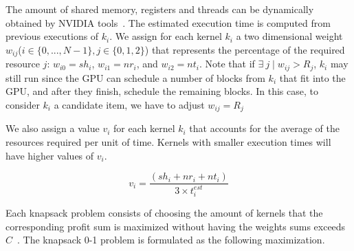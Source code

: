 \documentclass[conference]{IEEEtran}
\begin{document}

The amount of shared memory, registers and threads can be dynamically obtained by NVIDIA tools~\cite{}. The estimated execution time is computed from previous executions of $k_i$. We assign for each kernel $k_i$ a two dimensional weight $w_{ij}$($i \in \{0,...,N-1\}, j \in \{0,1,2\}$) that represents the percentage of the required resource $j$: $w_{i0} = sh_i$, $w_{i1} = nr_i$, and $w_{i2} = nt_i$. Note that if $\exists ~j \mid w_{ij} > R_j$, $k_i$ may still run since the GPU can schedule a number of blocks from $k_i$ that fit into the GPU, and after they finish, schedule the remaining blocks. In this case, to consider $k_i$ a candidate item, we have to adjust $w_{ij} = R_j$

We also assign a value $v_i$ for each kernel $k_i$ that accounts for the average of the resources required per unit of time. 
Kernels with smaller execution times will have higher values of $v_i$. 

\begin{equation}
\label{eq:value}
    v_i = \frac{(sh_i + nr_i + nt_i)}{3\times t^{est}_{i}}
\end{equation}

Each knapsack problem consists of choosing the amount of kernels that the corresponding profit sum is maximized without having the weights sums exceeds $C$~\cite{Martello:1990}. The knapsack 0-1 problem is formulated as the following maximization.
\end{document}
